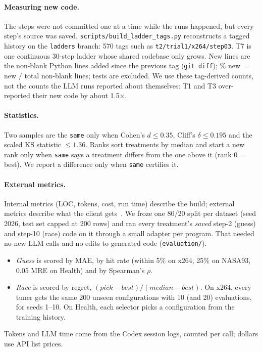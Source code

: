\documentclass[acmsmall,nonacm]{acmart}
\newcommand{\same}{\texttt{same}}
\begin{document}
\paragraph{Measuring new code.} The steps were not committed one at a time while the runs happened, but every step's source was saved. \texttt{scripts/build\_ladder\_tags.py} reconstructs a tagged history on the \texttt{ladders} branch: 570 tags such as \texttt{t2/trial1/x264/step03}. T7 is one continuous 30-step ladder whose shared codebase only grows. New lines are the non-blank Python lines added since the previous tag (\texttt{git diff}); \% new = new / total non-blank lines; tests are excluded. We use these tag-derived counts, not the counts the LLM runs reported about themselves: T1 and T3 over-reported their new code by about 1.5$\times$.

\paragraph{Statistics.} Two samples are the \same{} only when Cohen's $d \le 0.35$, Cliff's $\delta \le 0.195$ and the scaled KS statistic $\le 1.36$. Ranks sort treatments by median and start a new rank only when \same{} says a treatment differs from the one above it (rank 0 = best). We report a difference only when \same{} certifies it.

\paragraph{External metrics.} Internal metrics (LOC, tokens, cost, run time) describe the build; external metrics describe what the client gets~\cite{fenton2014metrics}. We froze one 80/20 split per dataset (seed 2026, test set capped at 200 rows) and ran every treatment's \emph{saved} step-2 (guess) and step-10 (race) code on it through a small adapter per program. That needed no new LLM calls and no edits to generated code (\texttt{evaluation/}).
\begin{itemize}
\item \emph{Guess} is scored by MAE, by hit rate (within 5\% on x264, 25\% on NASA93, 0.05 MRE on Health) and by Spearman's $\rho$.
\item \emph{Race} is scored by regret, $(\mathit{pick}-\mathit{best})/(\mathit{median}-\mathit{best})$. On x264, every tuner gets the same 200 unseen configurations with 10 (and 20) evaluations, for seeds 1--10. On Health, each selector picks a configuration from the training history.
\end{itemize}
Tokens and LLM time come from the Codex session logs, counted per call; dollars use API list prices.
\end{document}
